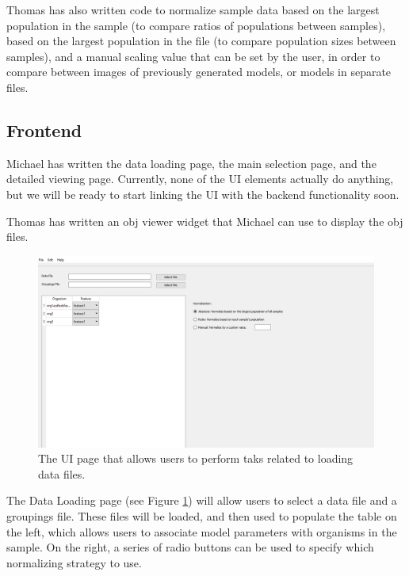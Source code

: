 \documentclass[letterpaper,10pt, onecolumn]{IEEEtran}
\begin{document}
Thomas has also written code to normalize sample data based on the largest population in the sample (to compare ratios of populations between samples), based on the largest population in the file (to compare population sizes between samples), and a manual scaling value that can be set by the user, in order to compare between images of previously generated models, or models in separate files.

\subsection*{Frontend}

Michael has written the data loading page, the main selection page, and the detailed viewing page. Currently, none of the UI elements actually do anything, but we will be ready to start linking the UI with the backend functionality soon.

Thomas has written an obj viewer widget that Michael can use to display the obj files.

\begin{figure}
	\includegraphics[width=\textwidth]{LoadingInterface}
	\caption{The UI page that allows users to perform taks related to loading data files.}
	\label{fig:LoadingInterface}
\end{figure}

The Data Loading page (see Figure \ref{fig:LoadingInterface}) will allow users to select a data file and a groupings file. These files will be loaded, and then used to populate the table on the left, which allows users to associate model parameters with organisms in the sample. On the right, a series of radio buttons can be used to specify which normalizing strategy to use.
\end{document}
